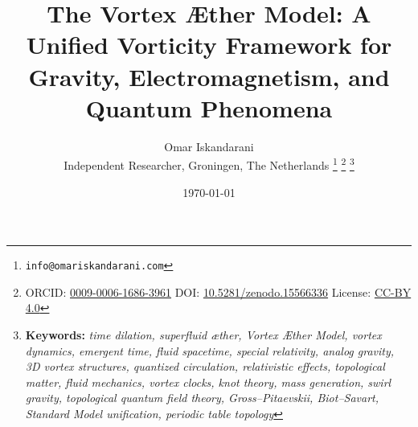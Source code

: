 \documentclass[a4paper,12pt]{article}
\begin{document}
    \title{The Vortex Æther Model: A Unified Vorticity Framework for Gravity, Electromagnetism, and Quantum Phenomena}
    \date{\today}
    \author{
        Omar Iskandarani\\
        \small Independent Researcher, Groningen, The Netherlands
        \thanks{\texttt{info@omariskandarani.com}}
        \thanks{ORCID: \href{https://orcid.org/0009-0006-1686-3961}{0009-0006-1686-3961} \quad DOI: \href{https://doi.org/10.5281/zenodo.15566336}{10.5281/zenodo.15566336} \quad License: \href{https://creativecommons.org/licenses/by/4.0/}{CC-BY 4.0}}
        \noindent\thanks{\textbf{Keywords:} \textit{time dilation, superfluid æther, Vortex Æther Model, vortex dynamics, emergent time, fluid spacetime, special relativity, analog gravity, 3D vortex structures, quantized circulation, relativistic effects, topological matter, fluid mechanics, vortex clocks, knot theory, mass generation, swirl gravity, topological quantum field theory, Gross--Pitaevskii, Biot--Savart, Standard Model unification, periodic table topology}}
    }
    \maketitle
\end{document}
